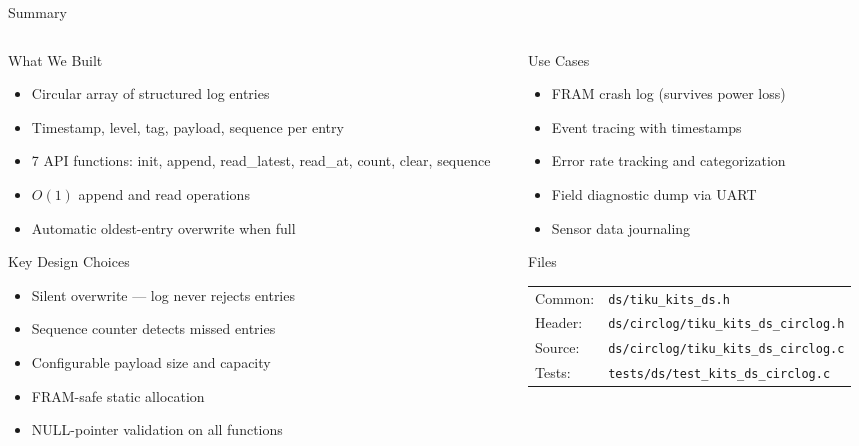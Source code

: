 \documentclass[aspectratio=169, 10pt]{beamer}
\begin{document}
\begin{frame}{Summary}
\begin{columns}[T]
\begin{column}{0.48\textwidth}
\begin{block}{What We Built}
\begin{itemize}
  \item Circular array of structured log entries
  \item Timestamp, level, tag, payload, sequence per entry
  \item 7 API functions: init, append, read\_latest, read\_at, count, clear, sequence
  \item $O(1)$ append and read operations
  \item Automatic oldest-entry overwrite when full
\end{itemize}
\end{block}

\begin{block}{Key Design Choices}
\begin{itemize}
  \item Silent overwrite --- log never rejects entries
  \item Sequence counter detects missed entries
  \item Configurable payload size and capacity
  \item FRAM-safe static allocation
  \item NULL-pointer validation on all functions
\end{itemize}
\end{block}
\end{column}

\begin{column}{0.48\textwidth}
\begin{block}{Use Cases}
\begin{itemize}
  \item FRAM crash log (survives power loss)
  \item Event tracing with timestamps
  \item Error rate tracking and categorization
  \item Field diagnostic dump via UART
  \item Sensor data journaling
\end{itemize}
\end{block}

\begin{block}{Files}
\scriptsize
\begin{tabular}{@{}lp{4.5cm}@{}}
Common: & \texttt{ds/tiku\_kits\_ds.h} \\
Header: & \texttt{ds/circlog/tiku\_kits\_ds\_circlog.h} \\
Source: & \texttt{ds/circlog/tiku\_kits\_ds\_circlog.c} \\
Tests:  & \texttt{tests/ds/test\_kits\_ds\_circlog.c} \\
\end{tabular}
\end{block}
\end{column}
\end{columns}
\end{frame}
\end{document}
